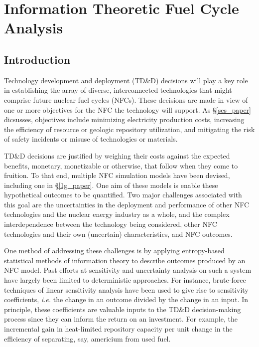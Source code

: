 \chapter{Information Theoretic Fuel Cycle Analysis}
\label{cts_paper}



\section{Introduction}
\label{cts_sec:intro}

Technology development and deployment (TD\&D) decisions will play a key role in
establishing the array of diverse, interconnected technologies that might comprise
future nuclear fuel cycles (NFCs).  These decisions are made in view of one or more
objectives for the NFC the technology will support.  As \S \ref{ses_paper} dicsusses,  
objectives include minimizing
electricity production costs, increasing the efficiency of resource or geologic
repository utilization, and mitigating the risk of safety incidents or misuse of
technologies or materials.

TD\&D decisions are justified by weighing their costs against the expected benefits,
monetary, monetizable or otherwise, that follow when they come to fruition.  To that
end, multiple NFC simulation models  \cite{Jacobson2009, GENIUS1} have been devised, 
including one in \S \ref{1g_paper}.  
One aim of these models is enable these hypothetical outcomes to be quantified.  Two major 
challenges associated with this goal are the uncertainties in the deployment and performance 
of other NFC technologies and the nuclear energy industry as a whole, and the complex 
interdependence between the technology being considered, other NFC technologies and their 
own (uncertain) characteristics, and NFC outcomes.

One method of addressing these challenges is by applying entropy-based statistical methods of information
theory to describe outcomes produced by an NFC model.  Past efforts at sensitivity and uncertainty
analysis on such a system have largely been limited to deterministic approaches.  For instance,
brute-force techniques of linear sensitivity analysis have been used to give rise to sensitivity
coefficients, \emph{i.e.} the change in an outcome divided by the change in an input.  In principle, these
coefficients are valuable inputs to the TD\&D decision-making process since they can inform the
return on an investment.  For example, the incremental gain in heat-limited repository capacity per
unit change in the efficiency of separating, say, americium from used fuel.

